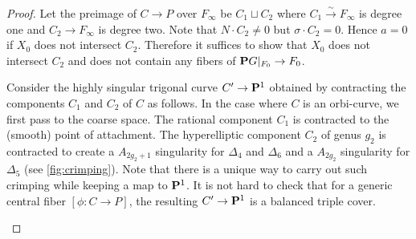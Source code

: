 \documentclass{amsart}
\renewcommand {\P}{{\bf P}}
\newcommand {\from}{{\colon}}
\newcommand{\isom}{\stackrel\sim\longrightarrow}
\begin{document}
\begin{proof}
 Let the preimage of $C \to P$ over $F_\infty$ be $C_1 \sqcup C_2$ where $C_1 \isom F_\infty$ is degree one and $C_2 \to F_\infty$ is degree two. Note that $N \cdot C_2 \neq 0$ but $\sigma \cdot C_2 = 0$. Hence $a = 0$ if $X_0$ does not intersect $C_2$. Therefore it suffices to show that $X_0$ does not intersect $C_2$ and does not contain any fibers of $\P G|_{F_0} \to F_0$. 

Consider the highly singular trigonal curve $C' \to \P^1$ obtained by contracting the components $C_1$ and $C_2$ of $C$ as follows. In the case where $C$ is an orbi-curve, we first pass to the coarse space. The rational component $C_1$ is contracted to the (smooth) point of attachment. The hyperelliptic component $C_2$ of genus $g_2$ is contracted to create a $A_{2g_2+1}$ singularity for $\Delta_4$ and $\Delta_6$ and a $A_{2g_2}$ singularity for $\Delta_5$ (see \autoref{fig:crimping}). Note that there is a unique way to carry out such crimping while keeping a map to $\P^1$. It is not hard to check that for a generic central fiber $[\phi \from C \to P]$, the resulting $C' \to \P^1$ is a balanced triple cover.
\begin{figure}[ht]
\end{figure}
\end{proof}
\end{document}
